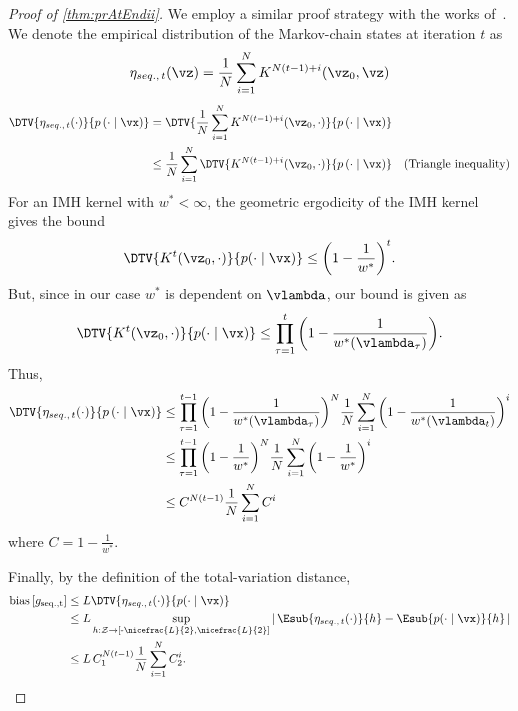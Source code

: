 
\prAtEndRestateii*
\label{proofsection:prAtEndii}\begin{proof}[Proof of \autoref{thm:prAtEndii}]\label{proof:prAtEndii}We employ a similar proof strategy with the works of~\citet [Theorem 4]{jiang_mcmc_2021}. We denote the empirical distribution of the Markov-chain states at iteration \(t\) as \begin {align} \eta _{seq.,\, t}(\vz ) = \frac {1}{N} \sum _{i=1}^N K^{N (t-1) + i}(\vz _0, \vz ) \end {align} \begin {align} \DTV { \eta _{seq.,\, t}(\cdot ) }{p\left (\cdot \mid \vx \right )} &= \DTV {\frac {1}{N} \sum _{i=1}^N K^{N (t-1) + i}(\vz _0, \cdot )}{p\left (\cdot \mid \vx \right )} \\ &\leq \frac {1}{N} \sum _{i=1}^N \DTV {K^{N (t-1) + i}(\vz _0, \cdot )}{p\left (\cdot \mid \vx \right )} &\text {(Triangle inequality)} \\ \end {align} For an IMH kernel with \(w^* < \infty \), the geometric ergodicity of the IMH kernel \citep [Theorem 2.1]{10.2307/2242610} gives the bound \begin {align} \DTV {K^t(\vz _{0}, \cdot )}{p(\cdot \mid \vx )} \leq {\left (1 - \frac {1}{w^*}\right )}^t. \end {align} But, since in our case \(w^*\) is dependent on \(\vlambda \), our bound is given as \begin {align} \DTV {K^t(\vz _{0}, \cdot )}{p(\cdot \mid \vx )} \leq \prod _{\tau =1}^t {\left (1 - \frac {1}{w^*(\vlambda _{\tau })}\right )}. \end {align} Thus, \begin {align} \DTV { \eta _{seq.,\, t}(\cdot ) }{p\left (\cdot \mid \vx \right )} &\leq \prod _{\tau =1}^{t-1} {\left ( 1 - \frac {1}{w^*(\vlambda _{\tau })} \right )}^N \frac {1}{N} \sum _{i=1}^N {\left ( 1 - \frac {1}{w^*(\vlambda _{t})} \right )}^i \\ &\leq \prod _{\tau =1}^{t-1} {\left ( 1 - \frac {1}{w^*} \right )}^N \frac {1}{N} \sum _{i=1}^N {\left ( 1 - \frac {1}{w^*} \right )}^i \\ &\leq C^{N (t-1)} \frac {1}{N} \sum _{i=1}^N C^i \end {align} where \(C = 1 - \frac {1}{w^*} \). \par Finally, by the definition of the total-variation distance, \begin {align} \mathrm {bias}\left [ g_{\mathrm {seq., t}} \right ] &\leq L \DTV {\eta _{seq.,\, t}(\cdot )}{p(\cdot \mid \vx )} \\ &\leq L \sup _{h : \mathcal {Z} \rightarrow \left [ \text {-}\nicefrac {L}{2}, \nicefrac {L}{2} \right ]} \left |\, \Esub {\eta _{seq.,\, t}(\cdot )}{h} - \Esub {p(\cdot \mid \vx )}{h} \,\right | \\ &\leq L \, C_1^{N (t-1)} \frac {1}{N} \sum _{i=1}^N C_2^i. \end {align}\end{proof}
